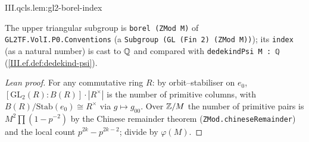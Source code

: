 \begin{lemma}
\end{lemma}
\begin{tfformal}{III.qcls.lem:gl2-borel-index}
\begin{tffidelity}
The upper triangular subgroup is \texttt{borel (ZMod M)} of \texttt{GL2TF.VolI.P0.Conventions} (a \texttt{Subgroup (GL (Fin 2) (ZMod M))}); its \texttt{index} (as a natural number) is cast to $\mathbb{Q}$ and compared with \texttt{dedekindPsi M : ℚ} (\cref{III.ef.def:dedekind-psi}).
\end{tffidelity}
\end{tfformal}
\begin{proof}[Lean proof]
For any commutative ring $R$: by orbit--stabiliser on $e_0$, $[\mathrm{GL}_2(R):B(R)]\cdot|R^\times|$ is the number of primitive columns, with $B(R)/\mathrm{Stab}(e_0)\cong R^\times$ via $g\mapsto g_{00}$. Over $\mathbb{Z}/M$ the number of primitive pairs is $M^2\prod(1-p^{-2})$ by the Chinese remainder theorem (\texttt{ZMod.chineseRemainder}) and the local count $p^{2k}-p^{2k-2}$; divide by $\varphi(M)$.
\end{proof}

